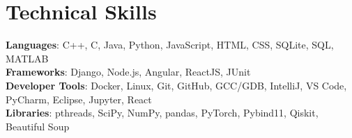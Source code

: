 \documentclass[letterpaper,11pt]{article}
\makeatletter
\newcommand{\resumeItem}[1]{
  \item\small{
    {#1 \vspace{-2pt}}
  }
}
\newcommand{\resumeProjectHeading}[2]{
    \item
    \begin{tabular*}{0.97\textwidth}{l@{\extracolsep{\fill}}r}
      \small#1 & #2 \\
    \end{tabular*}\vspace{-7pt}
}
\newcommand{\resumeSubHeadingListStart}{\begin{itemize}[leftmargin=0.15in, label={}]}
\newcommand{\resumeSubHeadingListEnd}{\end{itemize}}
\newcommand{\resumeItemListStart}{\begin{itemize}}
\newcommand{\resumeItemListEnd}{\end{itemize}\vspace{-5pt}}
\makeatother
\begin{document}


%
\section{Technical Skills}
 \begin{itemize}[leftmargin=0.15in, label={}]
    \small{\item{
     \textbf{Languages}{: C++, C, Java, Python, JavaScript, HTML, CSS, SQLite, SQL, MATLAB} \\
     \textbf{Frameworks}{: Django, Node.js, Angular, ReactJS, JUnit} \\
     \textbf{Developer Tools}{: Docker, Linux, Git, GitHub, GCC/GDB, IntelliJ, VS Code, PyCharm, Eclipse, Jupyter, React} \\
     \textbf{Libraries}{: pthreads, SciPy, NumPy, pandas, PyTorch, Pybind11, Qiskit, Beautiful Soup}
    }}
 \end{itemize}


\end{document}
